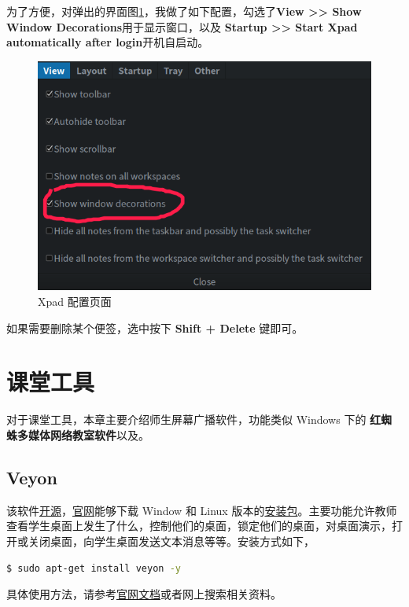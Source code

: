 \documentclass[doctor,openright,twoside]{sjtuthesis}
\theoremstyle{plain}
\theoremstyle{definition}
\theoremstyle{remark}
\theoremstyle{ocrenumbox}
\theoremstyle{plain}
\begin{document}
为了方便，对弹出的界面图\ref{fig:xpad-setwin}，我做了如下配置，勾选了\textbf{View \textgreater\textgreater{} Show Window Decorations}用于显示窗口，以及 \textbf{Startup \textgreater\textgreater{} Start Xpad automatically after login}开机自启动。

\begin{figure}

{\centering \includegraphics[width=0.618\linewidth]{images/education-xpad-setwin} 

}

\caption[Xpad 配置页面]{Xpad 配置页面}\label{fig:xpad-setwin}
\end{figure}

如果需要删除某个便签，选中按下 \textbf{Shift + Delete} 键即可。

\hypertarget{section-38}{%
\section{课堂工具}\label{section-38}}

对于课堂工具，本章主要介绍师生屏幕广播软件，功能类似 Windows 下的 \textbf{红蜘蛛多媒体网络教室软件}以及。

\hypertarget{veyon}{%
\subsection{Veyon}\label{veyon}}

该软件\href{https://github.com/veyon/veyon/}{开源}，\href{https://veyon.io/}{官网}能够下载 Window 和 Linux 版本的\href{https://veyon.io/download/}{安装包}。主要功能允许教师查看学生桌面上发生了什么，控制他们的桌面，锁定他们的桌面，对桌面演示，打开或关闭桌面，向学生桌面发送文本消息等等。安装方式如下，

\begin{lstlisting}[language=bash]
$ sudo apt-get install veyon -y
\end{lstlisting}

具体使用方法，请参考\href{https://veyon.io/docs/}{官网文档}或者网上搜索相关资料。
\end{document}
